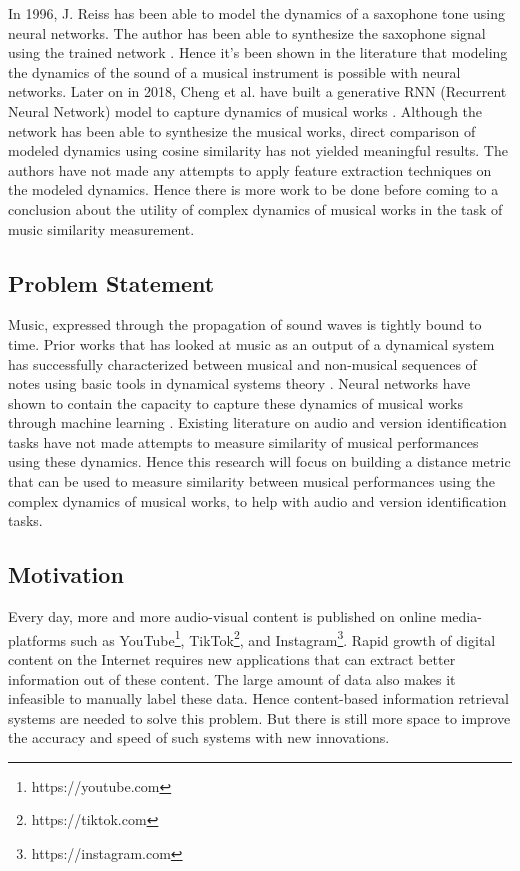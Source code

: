 \documentclass[../main.tex]{subfiles}
\begin{document}
\par
In 1996, J. Reiss has been able to model the dynamics of a saxophone tone using neural networks. The author has been able to synthesize the saxophone signal using the trained network \cite{robelNeuralNetworkModeling1997}. Hence it's been shown in the literature that modeling the dynamics of the sound of a musical instrument is possible with neural networks. Later on in 2018, Cheng et al. have built a generative \gls{RNN} (Recurrent Neural Network) model to capture dynamics of musical works  \cite{tian_cheng_comparing_2018}. Although the network has been able to synthesize the musical works, direct comparison of modeled dynamics using cosine similarity has not yielded meaningful results. The authors have not made any attempts to apply feature extraction techniques on the modeled dynamics. Hence there is more work to be done before coming to a conclusion about the utility of complex dynamics of musical works in the task of music similarity measurement.


\subsection{Problem Statement}

\par
Music, expressed through the propagation of sound waves is tightly bound to time. Prior works that has looked at music as an output of a dynamical system has successfully characterized between musical and non-musical sequences of notes using basic tools in dynamical systems theory \cite{complex_dynamics}. Neural networks have shown to contain the capacity to capture these dynamics of musical works through machine learning \cite{robelNeuralNetworkModeling1997,dynamic_process_modeling_with_rnn}. Existing literature on audio and version identification tasks have not made attempts to measure similarity of musical performances using these dynamics. Hence this research will focus on building a distance metric that can be used to measure similarity between musical performances using the complex dynamics of musical works, to help with audio and version identification tasks.



\subsection{Motivation}

\par
Every day, more and more audio-visual content is published on online media-platforms such as YouTube\footnote{https://youtube.com}, TikTok\footnote{https://tiktok.com}, and Instagram\footnote{https://instagram.com}. Rapid growth of digital content on the Internet requires new applications that can extract better information out of these content. The large amount of data also makes it infeasible to manually label these data. Hence content-based information retrieval systems are needed to solve this problem. But there is still more space to improve the accuracy and speed of such systems with new innovations.
\end{document}
